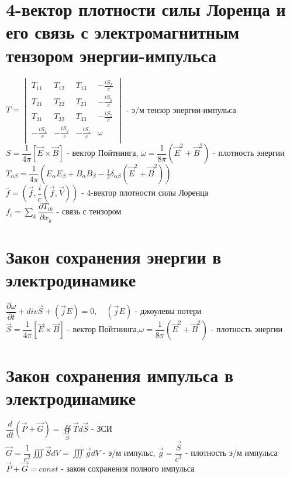 \begin{multicols*}{2}
		\section{4-вектор плотности силы Лоренца и его связь с электромагнитным тензором энергии-импульса}
		$T = \begin{vmatrix}
			T_{11}& T_{12}& T_{13}& -\frac{iS_x}{c}\\
			T_{21}& T_{22}& T_{23}& -\frac{iS_y}{c}\\
			T_{31}& T_{32}& T_{33}& -\frac{iS_z}{c}\\
			-\frac{iS_x}{c}& -\frac{iS_y}{c}& -\frac{iS_z}{c}& \omega \\
		\end{vmatrix}$ - э/м тензор энергии-импульса\\
		$S = \dfrac{1}{4\pi}\left[\vec{E}\times \vec{B}\right]$ - вектор Пойтнинга, \quad $\omega = \dfrac{1}{8\pi}(\vec{E}^2 + \vec{B}^2)$ - плотность энергии\\
		$T_{\alpha \beta} = \dfrac{1}{4\pi}(E_\alpha E_\beta + B_\alpha B_\beta - \frac{1}{2}\delta_{\alpha \beta}(\vec{E}^2 + \vec{B}^2))$\\
		$\bar{f} = (\vec{f}, \dfrac{i}{c}(\vec{f}, \vec{V}))$ - 4-вектор плотности силы Лоренца\\
		$f_i = \sum_{k}^{} \dfrac{\partial T_{ik}}{\partial x_k}$ - связь с тензором

		\section{Закон сохранения энергии в электродинамике}
		$\dfrac{\partial \omega}{\partial t} + div \vec{S} + (\vec{j}E) = 0, \quad (\vec{j}E)$ - джоулевы потери\\
		$\vec{S} = \dfrac{1}{4\pi}\left[\vec{E}\times \vec{B}\right]$ - вектор Пойтнинга,\quad $\omega = \dfrac{1}{8\pi}(\vec{E}^2 + \vec{B}^2)$ - плотность энергии
		
		\section{Закон сохранения импульса в электродинамике}
		$\dfrac{d}{dt}(\vec{P} + \vec{G}) = \oiint\limits_{S}{\vec{T}d\vec{S}}$ - ЗСИ\\
		$\vec{G} = \dfrac{1}{c^2}\iiint \vec{S}dV = \iiint \vec{g}dV$ - э/м импульс, \quad $\vec{g} = \dfrac{\vec{S}}{c^2}$ - плотность э/м импульса\\
		$\vec{P} + \vec{G} = const$ - закон сохранения полного импульса


\end{multicols*}

